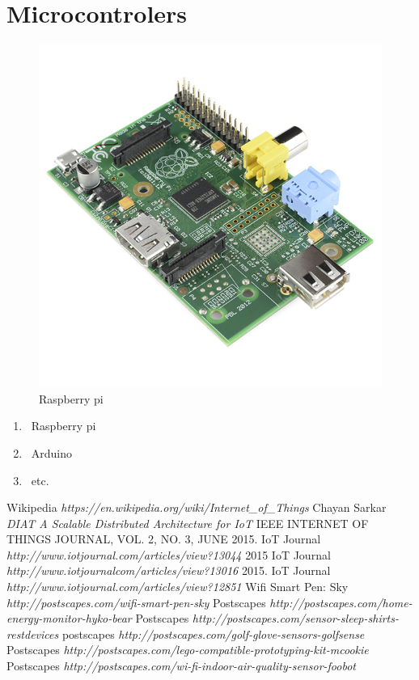 \documentclass[12pt]{article}
\begin{document}
\section {Microcontrolers}
\begin{figure}
\caption[width=50mm] {Raspberry pi}
\includegraphics{pi}
\end{figure}

\begin{enumerate}
\item\ Raspberry pi
\item\ Arduino
\item\ etc.
\end{enumerate}

 
 
 \begin{thebibliography}{1}
  Wikipedia \emph{https://en.wikipedia.org/wiki/Internet_of_Things}
  Chayan Sarkar \emph{DIAT A Scalable Distributed Architecture for IoT} IEEE INTERNET OF THINGS JOURNAL, VOL. 2, NO. 3, JUNE 2015.
  IoT Journal \emph{http://www.iotjournal.com/articles/view?13044} 2015
  IoT Journal \emph {http://www.iotjournalcom/articles/view?13016} 2015.
  IoT Journal \emph{http://www.iotjournal.com/articles/view?12851} 
  Wifi Smart Pen: Sky \emph{http://postscapes.com/wifi-smart-pen-sky} 
  Postscapes \emph{http://postscapes.com/home-energy-monitor-hyko-bear}
  Postscapes \emph{http://postscapes.com/sensor-sleep-shirts-restdevices}
  postscapes \emph {http://postscapes.com/golf-glove-sensors-golfsense}
  Postscapes \emph {http://postscapes.com/lego-compatible-prototyping-kit-mcookie}
  Postscapes \emph{http://postscapes.com/wi-fi-indoor-air-quality-sensor-foobot}

 \end{thebibliography}
\end{document}
